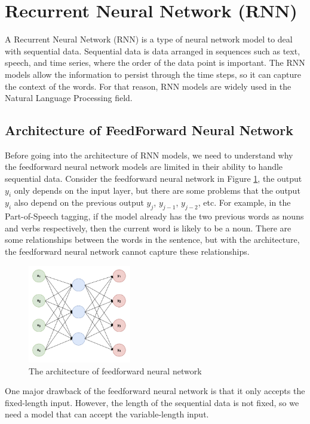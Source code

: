 \section{Recurrent Neural Network (RNN)}
A Recurrent Neural Network (RNN) is a type of neural network model to deal with sequential data. Sequential data is data arranged in sequences such as text, speech, and time series, where the order of the data point is important. The RNN models allow the information to persist through the time steps, so it can capture the context of the words. For that reason, RNN models are widely used in the Natural Language Processing field.

\subsection{Architecture of FeedForward Neural Network}
Before going into the architecture of RNN models, we need to understand why the feedforward neural network models are limited in their ability to handle sequential data. Consider the feedforward neural network in Figure \ref{fig:feedforward_architecture}, the output $y_{i}$ only depends on the input layer, but there are some problems that the output $y_{i}$ also depend on the previous output $y_{j}$, $y_{j-1}$, $y_{j-2}$, etc. For example, in the Part-of-Speech tagging, if the model already has the two previous words as nouns and verbs respectively, then the current word is likely to be a noun. There are some relationships between the words in the sentence, but with the architecture, the feedforward neural network cannot capture these relationships.

\begin{figure}[ht]
    \centering
    \includegraphics[width=0.4\textwidth]{Images/5.Theoretical_Background/feedforward_architecture.png}
    \caption{The architecture of feedforward neural network}
    \label{fig:feedforward_architecture}
\end{figure}

One major drawback of the feedforward neural network is that it only accepts the fixed-length input. However, the length of the sequential data is not fixed, so we need a model that can accept the variable-length input.

